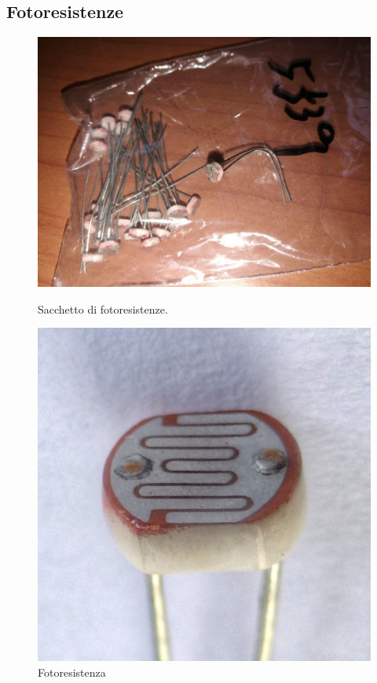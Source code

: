 \documentclass[12pt,oneside,a4paper]{article}
\begin{document}
\subsection{Fotoresistenze}
\begin{figure}[!htb]
    \includegraphics[width=\linewidth]{figures/fotoresistenze.jpg}
    \caption{Sacchetto di fotoresistenze.}
    \endminipage\hfill
    \includegraphics[width=\linewidth]{figures/fotoresistenza.jpg}
    \caption{Fotoresistenza}
    \endminipage\hfill
\end{figure}
\end{document}
